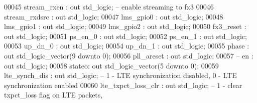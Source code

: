 \begin{DoxyCode}
00045         \textcolor{vhdlchar}{stream_rxen}     \textcolor{vhdlchar}{:} \textcolor{keywordflow}{out} \textcolor{comment}{std\_logic};\textcolor{keyword}{    -- enable streaming to fx3}
00046         \textcolor{vhdlchar}{stream_rxdsrc}   \textcolor{vhdlchar}{:} \textcolor{keywordflow}{out} \textcolor{comment}{std\_logic};
00047         \textcolor{vhdlchar}{lms_gpio0}       \textcolor{vhdlchar}{:} \textcolor{keywordflow}{out} \textcolor{comment}{std\_logic};
00048         \textcolor{vhdlchar}{lms_gpio1}       \textcolor{vhdlchar}{:} \textcolor{keywordflow}{out} \textcolor{comment}{std\_logic};
00049         \textcolor{vhdlchar}{lms_gpio2}       \textcolor{vhdlchar}{:} \textcolor{keywordflow}{out} \textcolor{comment}{std\_logic};
00050         \textcolor{vhdlchar}{fx3_reset}       \textcolor{vhdlchar}{:} \textcolor{keywordflow}{out} \textcolor{comment}{std\_logic};
00051         \textcolor{vhdlchar}{ps_en_0}         \textcolor{vhdlchar}{:} \textcolor{keywordflow}{out} \textcolor{comment}{std\_logic};
00052         \textcolor{vhdlchar}{ps_en_1}         \textcolor{vhdlchar}{:} \textcolor{keywordflow}{out} \textcolor{comment}{std\_logic};
00053         \textcolor{vhdlchar}{up_dn_0}         \textcolor{vhdlchar}{:} \textcolor{keywordflow}{out} \textcolor{comment}{std\_logic};
00054         \textcolor{vhdlchar}{up_dn_1}         \textcolor{vhdlchar}{:} \textcolor{keywordflow}{out} \textcolor{comment}{std\_logic};
00055         \textcolor{vhdlchar}{phase}               \textcolor{vhdlchar}{:} \textcolor{keywordflow}{out} \textcolor{comment}{std\_logic\_vector}\textcolor{vhdlchar}{(}\textcolor{vhdllogic}{}\textcolor{vhdllogic}{9} \textcolor{keywordflow}{downto} \textcolor{vhdllogic}{}\textcolor{vhdllogic}{0}\textcolor{vhdlchar}{)};
00056         \textcolor{vhdlchar}{pll_areset}      \textcolor{vhdlchar}{:} \textcolor{keywordflow}{out} \textcolor{comment}{std\_logic};
00057 \textcolor{keyword}{--      en      : out std\_logic;}
00058         \textcolor{vhdlchar}{stateo}\textcolor{vhdlchar}{:} \textcolor{keywordflow}{out} \textcolor{comment}{std\_logic\_vector}\textcolor{vhdlchar}{(}\textcolor{vhdllogic}{}\textcolor{vhdllogic}{5} \textcolor{keywordflow}{downto} \textcolor{vhdllogic}{}\textcolor{vhdllogic}{0}\textcolor{vhdlchar}{)};
00059         \textcolor{vhdlchar}{lte_synch_dis}           \textcolor{vhdlchar}{:} \textcolor{keywordflow}{out} \textcolor{comment}{std\_logic};\textcolor{keyword}{    -- 1 - LTE synchronization disabled, 0 - LTE
       synchronization enabled}
00060         \textcolor{vhdlchar}{lte_txpct_loss_clr}  \textcolor{vhdlchar}{:} \textcolor{keywordflow}{out} \textcolor{comment}{std\_logic};\textcolor{keyword}{  -- 1 - clear txpct\_loss flag on LTE packets,}

\end{DoxyCode}
